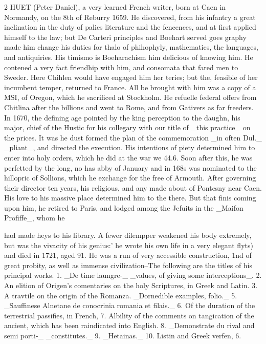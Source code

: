 \documentclass[10pt]{article}
\begin{document}
\begin{multicols}{2}
HUET (Peter Daniel), a very learned French writer, born at Caen in Normandy, on the 8th of Reburry 1659. He discovered, from his infantry a great inclination in the duty of palies literature and the fencences, and at first applied himself to the law; but De Carteri principles and Boehart served goes graphy made him change his duties for thalo of phihophyly, mathematics, the languages, and antiquiries. His timismo is Boeharachism him delicious of knowing him. He contened a very fact friendhip with him, and consomata that fared men to Sweder. Here Chihlen would have engaged him her teries; but the, feasible of her incumbent temper, returned to France. All be brought with him was a copy of a MSI, of Oregon, which he sacrificed at Stockholm. He refuelle federal offers from Chitlina after the billions and went to Rome, and from Gativers as far freeders. In 1670, the defining age pointed by the king perception to the daughn, his major, chief of the Hustic for his collegary with our title of \_this practice\_ on the prices. It was he dust formed the plan of the commemoration \_in often Dul.\_ \_pliant\_, and directed the execution. His intentions of piety determined him to enter into holy orders, which he did at the war we 44.6. Soon after this, he was perfetted by the long, no has abby of January and in 168s was nominated to the hillopric of Sollions, which he exchange for the free of Armouth. After governing their director ten years, his religious, and any made about of Pontesny near Caen. His love to his massive place determined him to the there. But that finis coming upon him, he retired to Paris, and lodged among the Jefuits in the \_Maifon Profiffe\_, whom he

had made heys to his library. A fewer dilempper weakened his body extremely, but was the vivacity of his genius:' he wrote his own life in a very elegant flyts) and died in 1721, aged 91. He was a run of very accessible construction, 1nd of great probity, as well as immense civilization--The following are the titles of his principal works. 1. \_De time laungre-\_ \_values, of giving some interceptions\_. 2. An elition of Origen's comentaries on the holy Scriptures, in Greek and Latin. 3. A travtile on the origin of the Romanza. \_Dornedible examples, folio.\_ 5. \_Sauffinese Alnetane de conocrinia romania et filais.\_ 6. Of the duration of the terrestrial passifies, in French, 7. Albility of the comments on tangication of the ancient, which has been raindicated into English. 8. \_Demonstrate du rival and semi porti-\_ \_constitutes.\_ 9. \_Hetainas.\_ 10. Listin and Greek verfen, 6.


\end{multicols}
\end{document}
